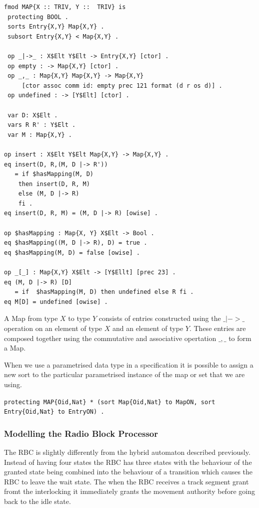 \begin{lstlisting}[caption = The specification of the Map data type in Maude]
fmod MAP{X :: TRIV, Y ::  TRIV} is
 protecting BOOL .
 sorts Entry{X,Y} Map{X,Y} .
 subsort Entry{X,Y} < Map{X,Y} .

 op _|->_ : X$Elt Y$Elt -> Entry{X,Y} [ctor] .
 op empty : -> Map{X,Y} [ctor] .
 op _,_ : Map{X,Y} Map{X,Y} -> Map{X,Y} 
     [ctor assoc comm id: empty prec 121 format (d r os d)] .
 op undefined : -> [Y$Elt] [ctor] .

 var D: X$Elt .
 vars R R' : Y$Elt .
 var M : Map{X,Y} .

op insert : X$Elt Y$Elt Map{X,Y} -> Map{X,Y} .
eq insert(D, R,(M, D |-> R'))
   = if $hasMapping(M, D)
    then insert(D, R, M)
    else (M, D |-> R)
    fi .
eq insert(D, R, M) = (M, D |-> R) [owise] .

op $hasMapping : Map{X, Y} X$Elt -> Bool .
eq $hasMapping((M, D |-> R), D) = true .
eq $hasMapping(M, D) = false [owise] .

op _[_] : Map{X,Y} X$Elt -> [Y$Ellt] [prec 23] .
eq (M, D |-> R) [D]
   = if  $hasMapping(M, D) then undefined else R fi .
eq M[D] = undefined [owise] .
\end{lstlisting}
A Map from type $X$ to type $Y$ consists of entries constructed using the $\_|->\_$ operation on an element of type $X$ and an element of type $Y$. These entries are composed together using the commutative and associative opertation $\_,\_$ to form a Map.  

When we use a parametrised data type in a specification it is possible to assign a new sort to the particular parametrised instance of the map or set that we are using.
\begin{center}
\texttt{protecting MAP\{Oid,Nat\}  * (sort Map\{Oid,Nat\} to MapON,
                               sort Entry\{Oid,Nat\} to EntryON) .}
\end{center}




\subsubsection*{Modelling the Radio Block Processor}
The RBC is slightly differently from the hybrid automaton described previously. Instead of having four states the RBC has three states with the behaviour of the granted state being combined into the behaviour of a transition which causes the RBC to leave the wait state. The when the RBC receives a track segment grant fromt the interlocking it immediately grants the movement authority before going back to the idle state.
 
